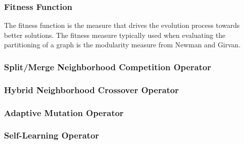 \subsubsection{Fitness Function}
The fitness function is the measure that drives the evolution process towards better solutions. The fitness measure typically used when evaluating the partitioning of a graph is the modularity measure from Newman and Girvan\cite{Newman2004}.
\subsubsection{Split/Merge Neighborhood Competition Operator}
\subsubsection{Hybrid Neighborhood Crossover Operator}
\subsubsection{Adaptive Mutation Operator}
\subsubsection{Self-Learning Operator}



